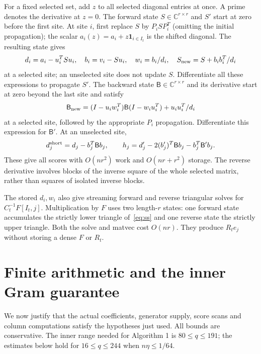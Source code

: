 \documentclass[11pt]{article}
\theoremstyle{remark}\newtheorem{remark}[theorem]{Remark}
\newcommand{\C}{\mathbb C}
\begin{document}
For a fixed selected set, add $z$ to all selected diagonal entries at once.
A prime denotes the derivative at $z=0$. The forward state $S\in\C^{r\times r}$
and $S'$ start at zero before the first site. At site $i$, first
replace $S$ by $P_iSP_i^T$ (omitting the initial propagation); the scalar
$a_i(z)=a_i+z\mathbf 1_{i\in I_t}$ is the shifted diagonal. The resulting state gives
\begin{equation}\label{eq:forward}
 d_i=a_i-u_i^TSu_i,\quad b_i=v_i-Su_i,\quad
 w_i=b_i/d_i,\quad S_{\rm new}=S+b_ib_i^T/d_i
\end{equation}
at a selected site; an unselected site does not update $S$.
Differentiate all these expressions to propagate $S'$.
The backward state $\mathsf B\in\C^{r\times r}$ and its derivative
start at zero beyond the last site and satisfy
\begin{equation}\label{eq:backward}
 \mathsf B_{\rm new}=(I-u_iw_i^T)\mathsf B(I-w_iu_i^T)+u_iu_i^T/d_i
\end{equation}
at a selected site, followed by the appropriate $P_i$ propagation.
Differentiate this expression for $\mathsf B'$. At an unselected site,
\[
 d_j^{\rm short}=d_j-b_j^T\mathsf B b_j,\qquad
 h_j=d_j'-2(b_j')^T\mathsf B b_j-b_j^T\mathsf B'b_j.
\]
These give all scores with $O(nr^2)$ work and $O(nr+r^2)$ storage.
The reverse derivative involves blocks of the inverse square of the whole
selected matrix, rather than squares of isolated inverse blocks.

The stored $d_i,w_i$ also give streaming forward and reverse triangular solves
for $C_t^{-1}F[I_t,j]$. Multiplication by $F$ uses two length-$r$ states:
one forward state accumulates the strictly lower triangle of~\eqref{eq:ss}
and one reverse state the strictly upper triangle. Both the solve and matvec
cost $O(nr)$. They produce $R_te_j$ without storing a dense $F$ or $R_t$.

\section{Finite arithmetic and the inner Gram guarantee}\label{sec:round}
We now justify that the actual coefficients, generator supply, score scans
and column computations satisfy the hypotheses just used. All bounds are
conservative. The inner range needed for Algorithm 1 is $80\le q\le191$;
the estimates below hold for $16\le q\le244$ when $n\eta\le1/64$.
\end{document}
